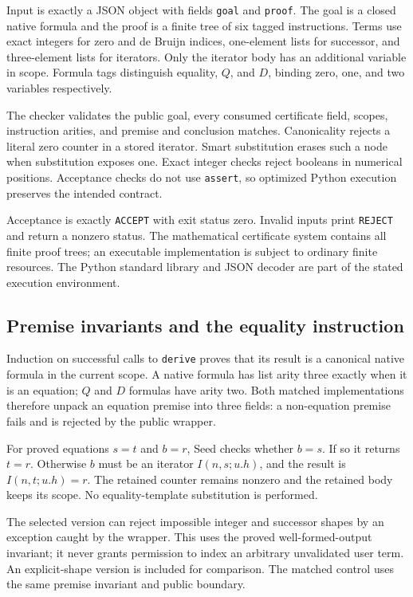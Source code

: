 \documentclass[11pt,a4paper]{article}
\theoremstyle{definition}
\begin{document}
Input is exactly a JSON object with fields \texttt{goal} and
\texttt{proof}. The goal is a closed native formula and the proof is a
finite tree of six tagged instructions. Terms use exact integers for
zero and de Bruijn indices, one-element lists for successor, and
three-element lists for iterators. Only the iterator body has an
additional variable in scope. Formula tags distinguish equality,
\(Q\), and \(D\), binding zero, one, and two variables respectively.

The checker validates the public goal, every consumed certificate field,
scopes, instruction arities, and premise and conclusion matches.
Canonicality rejects a literal zero counter in a stored iterator.
Smart substitution erases such a node when substitution exposes one.
Exact integer checks reject booleans in numerical positions.
Acceptance checks do not use \texttt{assert}, so optimized Python
execution preserves the intended contract.

Acceptance is exactly \texttt{ACCEPT} with exit status zero.
Invalid inputs print \texttt{REJECT} and return a nonzero status.
The mathematical certificate system contains all finite proof trees;
an executable implementation is subject to ordinary finite resources.
The Python standard library and JSON decoder are part of the stated
execution environment.

\subsection{Premise invariants and the equality instruction}

Induction on successful calls to \texttt{derive} proves that its
result is a canonical native formula in the current scope. A native
formula has list arity three exactly when it is an equation;
\(Q\) and \(D\) formulas have arity two. Both matched implementations
therefore unpack an equation premise into three fields: a non-equation
premise fails and is rejected by the public wrapper.

For proved equations \(s=t\) and \(b=r\), Seed checks whether \(b=s\).
If so it returns \(t=r\). Otherwise \(b\) must be an iterator
\(I(n,s;u.h)\), and the result is \(I(n,t;u.h)=r\).
The retained counter remains nonzero and the retained body keeps its
scope. No equality-template substitution is performed.

The selected version can reject impossible integer and successor
shapes by an exception caught by the wrapper. This uses the proved
well-formed-output invariant; it never grants permission to index an
arbitrary unvalidated user term. An explicit-shape version is included
for comparison. The matched control uses the same premise invariant
and public boundary.
\end{document}
